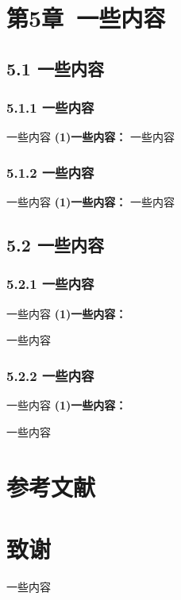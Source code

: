 \documentclass[10pt,a4paper]{report}
\newenvironment{acknowledgements}{
  \zihao{-4} %
  \setlength{\baselineskip}{20pt} %
}{
  \clearpage %
}
\begin{document}
\chapter{第5章\ 
一些内容}\label{ux7b2cux56dbux7ae0ux603bux7ed3ux4e0eux5c55ux671b}

\section{5.1
一些内容}\label{41-ux4e3bux8981ux7814ux7a76ux6210ux679cux603bux7ed3}
\subsection{5.1.1
一些内容}
一些内容
\textbf{(1)一些内容：}
一些内容
\subsection{5.1.2
一些内容}
一些内容
\textbf{(1)一些内容：}
一些内容
\section{5.2
一些内容}\label{43-ux9762ux4e34ux7684ux6311ux6218ux4e0eux6539ux8fdbux65b9ux5411}
\subsection{5.2.1
一些内容}
一些内容
\textbf{(1)一些内容：}

一些内容

\subsection{5.2.2
一些内容}
一些内容
\textbf{(1)一些内容：}

一些内容

\clearpage %



\chapter*{\fontsize{18pt}{22pt}\selectfont 参考文献}

\printbibliography

\clearpage %

\chapter*{\fontsize{18pt}{22pt}\selectfont 致谢}
\begin{acknowledgements}
一些内容
\end{acknowledgements}
\end{document}

